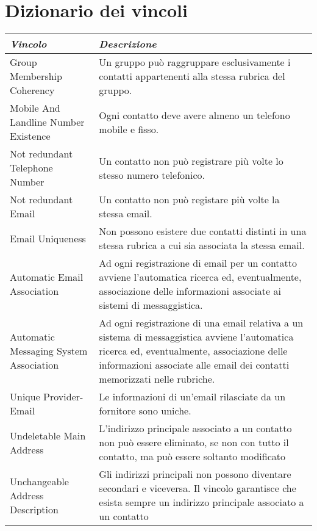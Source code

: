 \section{Dizionario dei vincoli}
\begin{longtable}{p{}p{}}
\toprule
\textit{Vincolo} & \textit{Descrizione}
\\ \midrule
Group Membership Coherency &
Un gruppo può raggruppare esclusivamente i contatti appartenenti alla stessa rubrica del gruppo.
\\ \midrule
Mobile And Landline Number Existence & 
Ogni contatto deve avere almeno un telefono mobile e fisso. 
\\ \midrule
Not redundant Telephone Number & 
Un contatto non può registrare più volte lo stesso numero telefonico.
\\ \midrule
Not redundant Email & 
Un contatto non può registare più volte la stessa email. 
\\ \midrule
Email Uniqueness & 
Non possono esistere due contatti distinti in una stessa rubrica a cui sia associata la stessa email. 
\\ \midrule
Automatic Email Association & 
Ad ogni registrazione di email per un contatto avviene l'automatica ricerca ed, eventualmente, associazione delle informazioni associate ai sistemi di messaggistica. 
\\ \midrule
Automatic Messaging System Association & 
Ad ogni registrazione di una email relativa a un sistema di messaggistica avviene l'automatica ricerca ed, eventualmente, associazione delle informazioni associate alle email dei contatti memorizzati nelle rubriche. 
\\ \midrule
Unique Provider-Email & 
Le informazioni di un'email rilasciate da un fornitore sono uniche. 
\\ \midrule
Undeletable Main Address & 
L'indirizzo principale associato a un contatto non può essere eliminato, se non con tutto il contatto, ma può essere soltanto modificato
\\ \midrule
Unchangeable Address Description  & 
Gli indirizzi principali non possono diventare secondari e viceversa. Il vincolo garantisce che esista sempre un indirizzo principale associato a un contatto
\\ \bottomrule
\endhead
\end{longtable}